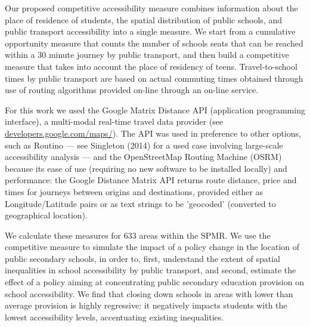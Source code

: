 \documentclass[3p,authoryear,preprint,review,12pt]{elsarticle}
\begin{document}
Our proposed competitive accessibility measure combines information
about the place of residence of students, the spatial distribution of public schools, and public transport accessibility into a single
measure. We start from a cumulative opportunity measure that counts the number of schools seats that can be reached within a 30 minute journey by public transport, and then build a competitive measure that takes into account the place of residency of teens. Travel-to-school times by public transport are based on actual commuting times obtained through use of routing algorithms provided on-line through an on-line service. 

For this work we used the Google Matrix Distance API
(application programming interface), a multi-modal
real-time travel data provider (see \href{https://developers.google.com/maps/documentation/distance-matrix/}{developers.google.com/maps/}). 
The API was used in preference to other options,
such as Routino --- see Singleton (2014) for a used case involving large-scale accessibility analysis ---
and the OpenStreetMap Routing Machine (OSRM)
because its
ease of use (requiring no new software to be installed locally)
and performance: the Google Distance Matrix
API returns
route distance, price and times for journeys between origins and
destinations, provided either as Longitude/Latitude pairs or
as text strings to be 'geocoded' (converted to geographical location).

We calculate these measures for 633 areas within the SPMR. We use the competitive measure to simulate the impact of a policy change in the location of public secondary schools, in order to, first, understand the extent of spatial inequalities in school accessibility by public transport, and second, estimate the
effect of a policy aiming at concentrating public secondary education provision on school accessibility. We find that closing down schools in areas with lower than average provision is highly regressive: it
negatively impacts students with the lowest accessibility levels,
accentuating existing inequalities.
\end{document}
